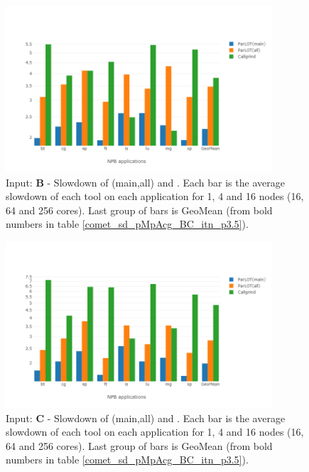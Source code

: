 \begin{figure}[!t]
\centering
\includegraphics[width=3.9in]{figs.comet/comet_chartAvg_sd_B_p3_5.png}
\caption{ Input: \textbf{B} - Slowdown of \parlot(main,all) and \callgrind. Each bar is the average slowdown of each tool on each application for 1, 4 and 16 nodes (16, 64 and 256 cores). Last group of bars is GeoMean (from bold numbers in table \ref{comet_sd_pMpAcg_BC_itn_p3.5}). 
}
\label{comet_chartAvg_sd_B_p3_5}
\end{figure}


\begin{figure}[!t]
\centering
\includegraphics[width=3.9in]{figs.comet/comet_chartAvg_sd_C_p3_5.png}
\caption{ Input: \textbf{C} - Slowdown of \parlot(main,all) and \callgrind. Each bar is the average slowdown of each tool on each application for 1, 4 and 16 nodes (16, 64 and 256 cores). Last group of bars is GeoMean (from bold numbers in table \ref{comet_sd_pMpAcg_BC_itn_p3.5}). 
}
\label{comet_chartAvg_sd_C_p3_5}
\end{figure}




